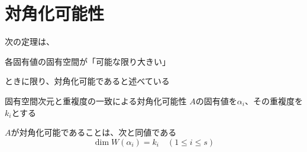 \documentclass[../../../topic_linear-algebra]{subfiles}
\begin{document}
\sectionline
\section{対角化可能性}

次の定理は、
\begin{shaded}
  各固有値の固有空間が「可能な限り大きい」
\end{shaded}
ときに限り、対角化可能であると述べている

\begin{theorem}{固有空間次元と重複度の一致による対角化可能性}
  $A$の固有値を$\alpha_i$、その重複度を$k_i$とする

  $A$が対角化可能であることは、次と同値である
  \begin{equation*}
    \dim W(\alpha_i) = k_i \quad (1 \leq i \leq s)
  \end{equation*}
\end{theorem}
\end{document}
